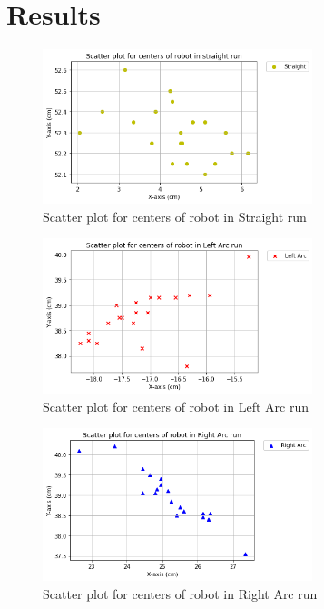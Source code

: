 \documentclass[10pt,a4paper]{article}
\begin{document}
	\section{Results}
			\begin{figure}[h]
				\centering
				\includegraphics[width=0.7\textwidth]{scatter_plot_st.png}
				\caption{Scatter plot for centers of robot in Straight run}
			\end{figure}
			\begin{figure}[h]
				\centering
				\includegraphics[width=0.7\textwidth]{scatter_plot_lt.png}
				\caption{Scatter plot for centers of robot in Left Arc run}
			\end{figure}
			\begin{figure}[h]
				\centering
				\includegraphics[width=0.7\textwidth]{scatter_plot_rt.png}
				\caption{Scatter plot for centers of robot in Right Arc run}
			\end{figure}
\end{document}

